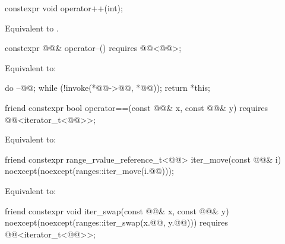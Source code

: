 %
\begin{itemdecl}
constexpr void operator++(int);
\end{itemdecl}

\begin{itemdescr}
\pnum
\effects
Equivalent to .
\end{itemdescr}

%
\begin{itemdecl}
constexpr @@& operator--() requires @@<@@>;
\end{itemdecl}

\begin{itemdescr}
\pnum
\effects
Equivalent to:
\begin{codeblock}
do
  --@@;
while (!invoke(*@@->@@, *@@));
return *this;
\end{codeblock}
\end{itemdescr}

%
\begin{itemdecl}
friend constexpr bool operator==(const @@& x, const @@& y)
  requires @@<iterator_t<@@>>;
\end{itemdecl}

\begin{itemdescr}
\pnum
\effects
Equivalent to: 
\end{itemdescr}

%
\begin{itemdecl}
friend constexpr range_rvalue_reference_t<@@> iter_move(const @@& i)
  noexcept(noexcept(ranges::iter_move(i.@@)));
\end{itemdecl}

\begin{itemdescr}
\pnum
\effects
Equivalent to: 
\end{itemdescr}

%
\begin{itemdecl}
friend constexpr void iter_swap(const @@& x, const @@& y)
  noexcept(noexcept(ranges::iter_swap(x.@@, y.@@)))
  requires @@<iterator_t<@@>>;
\end{itemdecl}

